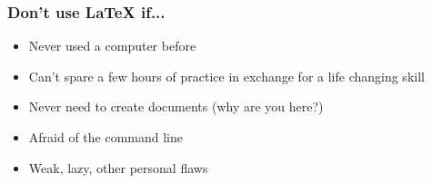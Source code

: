 \documentclass[notes=only]{beamer}
\begin{document}
\begin{frame} \frametitle{Don't use LaTeX if...}
    \begin{itemize}
        \item Never used a computer before
        \item Can't spare a few hours of practice in exchange for a life changing skill
        \item Never need to create documents (why are you here?)
        \item Afraid of the command line
        \item Weak, lazy, other personal flaws
    \end{itemize}
\end{frame}
\end{document}
